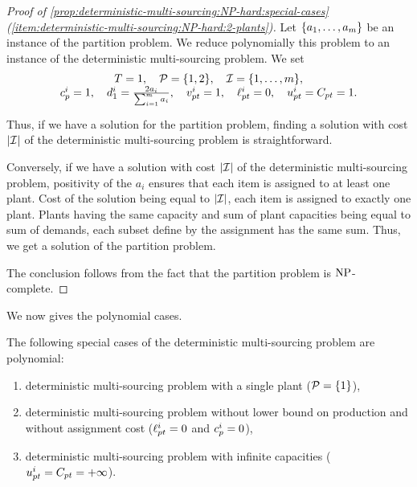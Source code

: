 \begin{proof}[Proof of \cref{prop:deterministic-multi-sourcing:NP-hard:special-cases} (\cref{item:deterministic-multi-sourcing:NP-hard:2-plants})]
Let $\crbracket{a_1,\ldots,a_m}$ be an instance of the partition problem.
We reduce polynomially this problem to an instance of the deterministic multi-sourcing problem.
We set
\begin{equation}
\begin{array}{c}
  \horizon=1
  ,\quad
  \plants=\crbracket{1,2}
  ,\quad
  \REF=\range[1]{m},
\\ \smallskip
  \affect_p^i=1
  ,\quad
  \demand_1^i=\frac{2a_i}{\sum_{i=1}^{m}a_i}
  ,\quad
  \rate_{pt}^i=1
  ,\quad
  \lb_{pt}^i=0
  ,\quad
  \ub_{pt}^i=\capacity_{pt}=1.
\end{array}
\end{equation}
Thus, if we have a solution for the partition problem, finding a solution with cost $\card{\REF}$ of the deterministic multi-sourcing problem is straightforward.


Conversely, if we have a solution with cost $\card{\REF}$ of the deterministic multi-sourcing problem, positivity of the $a_i$ ensures that each item is assigned to at least one plant.
Cost of the solution being equal to $\card{\REF}$, each item is assigned to exactly one plant.
Plants having the same capacity and sum of plant capacities being equal to sum of demands, each subset define by the assignment has the same sum.
Thus, we get a solution of the partition problem.


The conclusion follows from the fact that the partition problem is $\operatorname{NP}$-complete.
\end{proof}


We now gives the polynomial cases.


\begin{prop}\label{prop:deterministic-multi-sourcing:polynomial-cases}
The following special cases of the deterministic multi-sourcing problem are polynomial:
\begin{enumerate}
  \item deterministic multi-sourcing problem with a single plant ($\plants=\crbracket{1}$),
  \item deterministic multi-sourcing problem without lower bound on production and without assignment cost ($\ell_{pt}^i=0$ and $c_p^i=0$),
  \item deterministic multi-sourcing problem with infinite capacities ($u_{pt}^i=C_{pt}=+\infty$).
\end{enumerate}
\end{prop}


